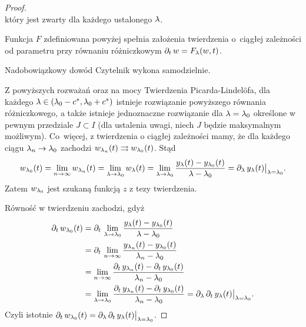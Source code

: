 \begin{proof}
\begin{equation*}
  \end{equation*}
%
  który jest zwarty dla każdego ustalonego $\l$.
%
  \begin{nestedlemma}
    Funkcja $F$ zdefiniowana powyżej spełnia założenia twierdzenia o~ciągłej zależności od parametru przy równaniu 
    różniczkowym $\pd{t} w = F_\l(w, t)$.
  \end{nestedlemma}
%
  \begin{nestedproof}
    Nadobowiązkowy dowód Czytelnik wykona samodzielnie.
  \end{nestedproof}
%
  Z powyższych rozważań oraz na mocy Twierdzenia Picarda-Lindelöfa, dla każdego $\l \in  (\l_0 - c^*, \l_0 + c^*)$ 
  istnieje rozwiązanie powyższego równania różniczkowego, a także istnieje jednoznaczne rozwiązanie dla $\l = \l_0$ 
  określone w pewnym przedziale $J \subset I$ (dla ustalenia uwagi, niech $J$ będzie maksymalnym możliwym). Co~więcej, 
  z twierdzenia o ciągłej zależności mamy, że dla każdego ciągu $\l_n \to \l_0$ zachodzi $w_{\l_n}(t) \rightrightarrows 
  w_{\l_0}(t)$. Stąd
%
  \begin{equation*}
    w_{\l_0}(t) = \lim_{n \to \infty} w_{\l_n}(t) = \lim_{\l \to \l_0} w_{\l}(t) = \lim_{\l \to \l_0} \frac{ y_\l(t) - 
    y_{\l_0}(t) }{ \l - \l_0 } = \pd{ \l } y_\l(t) \big\vert_{ \l = \l_0 }.
  \end{equation*}
%
  Zatem $w_{\l_0}$ jest szukaną funkcją $z$ z tezy twierdzenia.

Równość w twierdzeniu zachodzi, gdyż
%
  \begin{align*}
    \pd{t} w_{\l_0}(t) &= \pd{t} \lim_{\l \to \l_0}  \frac{ y_\l(t) - y_{\l_0}(t) }{ \l - \l_0 } \\ &= \pd{t} \lim_{n 
    \to 
    \infty}
    \frac{ y_{\l_n}(t) - y_{\l_0}(t) }{ \l_n - \l_0 } \\
    &= \lim_{n \to \infty} \frac{  \pd{t} y_{\l_n}(t) -  \pd{t} y_{\l_0}(t) }{ \l_n - \l_0 } \\ &= \lim_{\l \to \l_0} 
    \frac{  
    \pd{t} y_{\l_n}(t) -  \pd{t} y_{\l_0}(t) }{ \l_n - \l_0 }
    = \pd{\l } \pd{t} y_\l (t) \big\vert_{ \l = \l_0 }.
  \end{align*}
%
  Czyli istotnie $\pd{t} w_{\l_0}(t) = \pd{\l } \pd{t} y_\l (t) \big\vert_{ \l = \l_0 }$.
\end{proof}


























